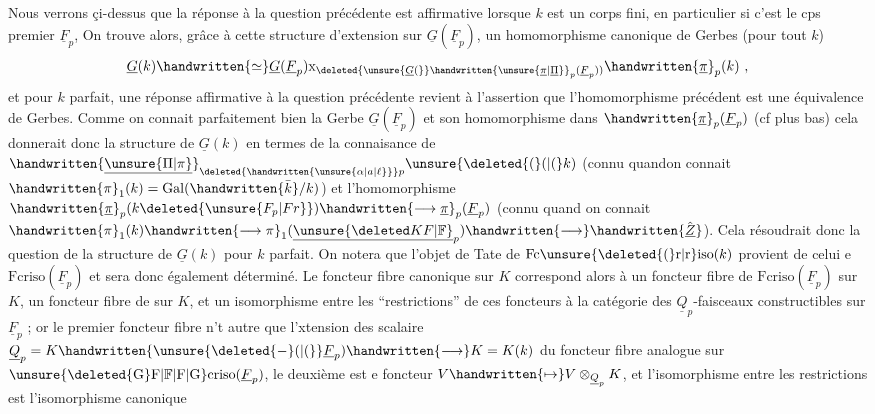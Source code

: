 
 Nous verrons çi-dessus que la réponse à la question précédente est affirmative lorsque $k$ est un corps fini, en particulier si c'est le cps premier $\underline{F}_p$, On trouve alors, grâce à cette structure d'extension sur $\underline{G}(\underline{F}_p)$, un homomorphisme canonique de Gerbes (pour tout $k$)
\[
\underline{G}(k)\handwritten{\simeq}\underline{G}(\underline{F}_p)\mathrm{x}_{\deleted{\unsure{\underline{G}(}}\handwritten{\unsure{\underline{\pi}|\underline{\Pi}}}_p(\underline{F}_p))}\handwritten{\underline{\pi}}_p(k)\ ,
\]
et pour $k$ parfait, une réponse affirmative à la question précédente revient à l'assertion que l'homomorphisme précédent est une équivalence de Gerbes. Comme on connait parfaitement bien la Gerbe $\underline{G}(\underline{F}_p)$ et son homomorphisme dans $\handwritten{\underline{\pi}}_p(\underline{F}_p)$ (cf plus bas) cela donnerait donc la structure de $\underline{G}(k)$ en termes de la connaisance de  $\handwritten{\underline{\unsure{\Pi|\pi}}}_{\deleted{\handwritten{\unsure{\alpha|a|\ell}}}p}\unsure{\deleted{(}(|(}k)$ (connu quand\handwritten{/}on connait $\handwritten{\pi}_1(k)=\operatorname{Gal}(\handwritten{\bar{k}}/k)$) et  l'homomorphisme $\handwritten{\underline{\pi}}_p(k\deleted{\unsure{F_p|Fr}})\handwritten{\longrightarrow\underline{\pi}}_p(\underline{F}_p)$ (connu quand on connait $\handwritten{\pi}_1(k)\handwritten{\longrightarrow\pi}_1(\underline{\unsure{\deleted K F|\mathbb{F}}}_p)\handwritten{\longrightarrow}\handwritten{\hat{\underline{Z}}}$). Cela résoudrait donc la question de la structure de $\underline{G}(k)$ pour $k$ parfait. On notera que l'objet de Tate de $\mathrm{Fc}\unsure{\deleted{(}\mathrm r|\mathrm r}\mathrm{iso}(k)$ provient de celui e $\mathrm{Fcriso}(\underline{F}_p)$ et sera donc également déterminé. Le foncteur fibre canonique sur $K$ correspond alors à un foncteur fibre de $\mathrm{Fcriso}(\underline{F}_p)$ sur $K$, un foncteur fibre de  sur $K$, et un isomorphisme entre les ``restrictions'' de ces foncteurs à la catégorie des $\underline{Q}_p$-faisceaux constructibles sur $\underline{F}_p$ ; or le premier foncteur fibre n't autre que  l'xtension des scalaire $\underline{Q}_p=K\handwritten{\unsure{\deleted{-}(|(}}\underline{F}_p)\handwritten{\longrightarrow}K=K(k)$ du foncteur fibre analogue sur $\unsure{\deleted{\mathrm{G}}\mathrm{F}|\mathbb{F}|\mathrm{F}|\mathrm{G}}\mathrm{criso}(\underline{F}_p)$, le deuxième est e foncteur  $V\handwritten{\mapsto}V\otimes_{\underline{Q}_p}K$, et l'isomorphisme  entre les restrictions est l'isomorphisme canonique 